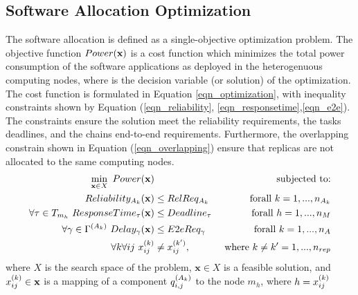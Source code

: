 \subsection{Software Allocation Optimization	}\label{sec_allocation}
The software allocation is defined as a single-objective optimization problem. The objective function  $Power(\textbf{x})$ is a cost function which minimizes the total power consumption of the software applications as deployed in the heterogenuous computing nodes, where \ttx is the decision variable (or solution) of the optimization. The cost function is formulated in Equation \ref{eqn_optimization}, with inequality constraints shown by Equation (\ref{eqn_reliability}, \ref{eqn_responsetime},\ref{eqn_e2e}). The constraints ensure the solution meet the reliability requirements, the tasks deadlines,  and the chains end-to-end requirements.  Furthermore, the overlapping constrain shown in Equation (\ref{eqn_overlapping}) ensure that replicas are not allocated to the same computing nodes.
\begin{align}
\label{eqn_optimization}
\min_{\textbf{x}\in X}\ Power(\textbf{x}) & &\text{ subjected to:} \\
\label{eqn_reliability}
\rel_{A_k}(\x)&\leq RelReq_{A_k} & \mbox{ forall } k=1,...,n_{A_k}\\
\label{eqn_responsetime}
\forall \tau\in T_{m_h}\    ResponseTime_{\tau}(\x)&\leq Deadline_{\tau}& \mbox{forall } h=1,...,n_{M}\\ 
\label{eqn_e2e}
\forall \gamma \in \ssp{\Gamma}\  Delay_\gamma(\x)&\leq E2eReq_\gamma& \mbox{forall } k=1,...,n_{A}\\
\label{eqn_overlapping}
\forall k\forall ij\ x_{ij}^{(k)}&\neq x_{ij}^{(k')},&  \mbox{ where } k\neq k'=1,...,n_{rep}
\end{align}
where $X$ is the search space of the problem, $\textbf{x}\in X$ is a feasible solution, and $x^{(k)}_{ij}\in \textbf{x}$ is a mapping of a component $\sss{q}[k][i,j]$ to the node $m_h$, where $h=x^{(k)}_{ij}$
%
%
